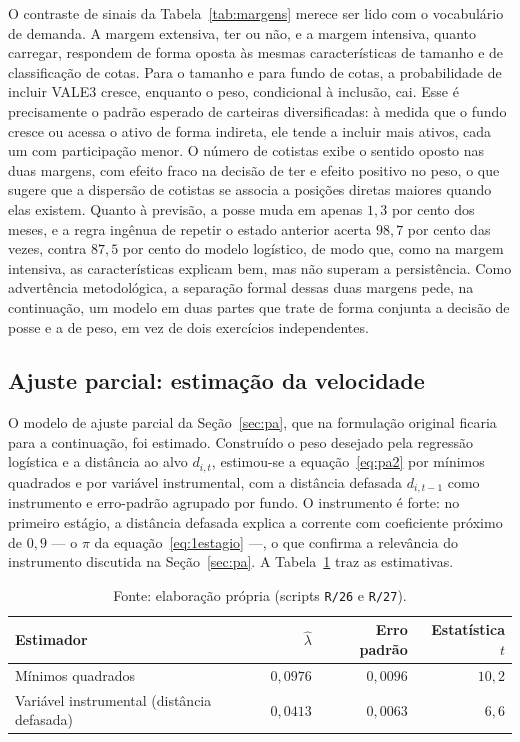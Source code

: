 \documentclass[12pt,a4paper]{article}
\begin{document}
O contraste de sinais da Tabela~\ref{tab:margens} merece ser lido com o vocabulário de demanda. A
margem extensiva, ter ou não, e a margem intensiva, quanto carregar, respondem de forma oposta às
mesmas características de tamanho e de classificação de cotas. Para o tamanho e para fundo de
cotas, a probabilidade de incluir VALE3 cresce, enquanto o peso, condicional à inclusão, cai. Esse
é precisamente o padrão esperado de carteiras diversificadas: à medida que o fundo cresce ou
acessa o ativo de forma indireta, ele tende a incluir mais ativos, cada um com participação menor.
O número de cotistas exibe o sentido oposto nas duas margens, com efeito fraco na decisão de ter e
efeito positivo no peso, o que sugere que a dispersão de cotistas se associa a posições diretas
maiores quando elas existem. Quanto à previsão, a posse muda em apenas $1{,}3$ por cento dos meses,
e a regra ingênua de repetir o estado anterior acerta $98{,}7$ por cento das vezes, contra $87{,}5$
por cento do modelo logístico, de modo que, como na margem intensiva, as características explicam
bem, mas não superam a persistência. Como advertência metodológica, a separação formal dessas duas margens
pede, na continuação, um modelo em duas partes que trate de forma conjunta a decisão de posse e a
de peso, em vez de dois exercícios independentes.

\subsection{Ajuste parcial: estimação da velocidade}
\label{sec:paest}

O modelo de ajuste parcial da Seção~\ref{sec:pa}, que na formulação original ficaria para a
continuação, foi estimado. Construído o peso desejado pela regressão logística e a distância ao
alvo $d_{i,t}$, estimou-se a equação~\eqref{eq:pa2} por mínimos quadrados e por variável
instrumental, com a distância defasada $d_{i,t-1}$ como instrumento e erro-padrão agrupado por
fundo. O instrumento é forte: no primeiro estágio, a distância defasada explica a corrente com
coeficiente próximo de $0{,}9$ --- o $\pi$ da equação~\eqref{eq:1estagio} ---, o que confirma a
relevância do instrumento discutida na Seção~\ref{sec:pa}. A Tabela~\ref{tab:lambda} traz as
estimativas.

\begin{table}[h]\centering\small
\caption{Velocidade de ajuste na equação da variação do peso. Erro-padrão agrupado por fundo;
10.570 observações de fundo-mês.}
\label{tab:lambda}
\begin{tabular}{@{}lrrr@{}}
\toprule
Estimador & $\widehat{\lambda}$ & Erro padrão & Estatística $t$ \\
\midrule
Mínimos quadrados                          & $0{,}0976$ & $0{,}0096$ & $10{,}2$ \\
Variável instrumental (distância defasada) & $0{,}0413$ & $0{,}0063$ & $6{,}6$  \\
\bottomrule
\end{tabular}
\caption*{\footnotesize Fonte: elaboração própria (scripts \texttt{R/26} e \texttt{R/27}).}
\end{table}
\end{document}
